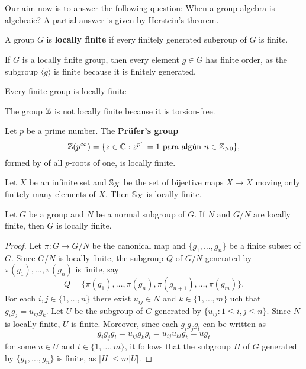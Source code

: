 \chapter{}


Our aim now is to answer the following question: When
a group algebra is algebraic? 
A partial answer is given by Herstein's theorem. 

\begin{definition}
	A group $G$ is \textbf{locally finite} if every finitely generated 
	subgroup of $G$ is finite. 
\end{definition}

If $G$ is a locally finite group, then every element $g\in G$ has finite order, as
the subgroup $\langle g\rangle$ is finite because it is finitely generated.

\begin{example}
    Every finite group is locally finite
\end{example}

\begin{example}
    The group $\mathbb{Z}$ is not locally finite because it is torsion-free.
\end{example}

\begin{example}
	Let $p$ be a prime number. 
	The \textbf{Pr\"ufer's group}  
	\[
		\mathbb{Z}(p^{\infty})=\{z\in\mathbb{C}:z^{p^n}=1\text{ para algún $n\in\mathbb{Z}_{>0}$}\}, 
	\]
	formed by of all $p$-roots of one, is locally finite. 
\end{example}

\begin{example}
	Let $X$ be an infinite set and $\mathbb{S}_X$ be the set of bijective maps $X\to
	X$ moving only finitely many elements of $X$. Then 
	$\mathbb{S}_X$ is locally finite.
\end{example}

\begin{proposition}
\label{pro:exact_LI}
	Let $G$ be a group and $N$ be a normal subgroup of $G$. If $N$ and $G/N$
	are locally finite, then $G$ is locally finite.
\end{proposition}

\begin{proof}
	Let $\pi\colon G\to G/N$ be the canonical map and $\{g_1,\dots,g_n\}$ be a finite subset of $G$. 
	Since $G/N$ is locally finite, the subgroup $Q$ of $G/N$ generated by 
	$\pi(g_1),\dots,\pi(g_n)$ is finite, say
	\[
		Q=\{\pi(g_1),\dots,\pi(g_n),\pi(g_{n+1}),\dots,\pi(g_m)\}.
	\]
	For each $i,j\in\{1,\dots,n\}$ there exist $u_{ij}\in N$ and 
	$k\in\{1,\dots,m\}$ uch that $g_ig_j=u_{ij}g_k$. Let $U$ be the subgroup of $G$
	generated by $\{u_{ij}:1\leq i,j\leq n\}$. Since $N$ is locally finite, $U$ is finite. Moreover, since 
	each $g_ig_jg_l$ can be written as 
	\[
		g_ig_jg_l=u_{ij}g_kg_l=u_{ij}u_{kl}g_t=ug_t
	\]
	for some $u\in U$ and $t\in\{1,\dots,m\}$, it follows that the subgroup 
	$H$ of $G$ generated by $\{g_1,\dots,g_n\}$ is finite, as 
	$|H|\leq m|U|$. 
\end{proof}

